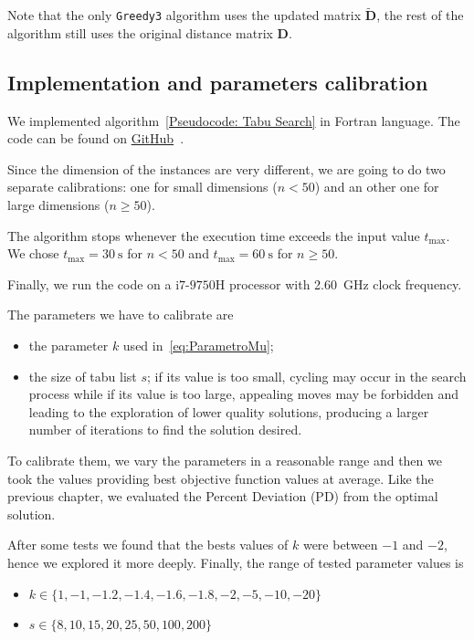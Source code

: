 Note that the only \texttt{Greedy3} algorithm uses the updated matrix $\tilde{\bm D}$, the rest of the algorithm still uses the original distance matrix $\bm D$.



\subsection*{Implementation and parameters calibration}
We implemented algorithm~\ref{Pseudocode: Tabu Search} in Fortran language. The code can be found on \href{https://github.com/TDS-Firenze/QAP/blob/master/TABU_SEARCH.f90}{GitHub}~\cite{Mazzoli2020}.

Since the dimension of the instances are very different, we are going to do two separate calibrations: one for small dimensions ($n < 50$) and an other one for large dimensions ($n \ge 50$).

The algorithm stops whenever the execution time exceeds the input value $t_\mathrm{max}$. We chose $t_\mathrm{max}=\SI{30}{\second}$ for $n<50$ and $t_\mathrm{max}=\SI{60}{\second}$ for $n\ge 50$.

Finally, we run the code on a   i$7$-$9750$H processor with \SI{2.60}{\giga\Hz} clock frequency.

The parameters we have to calibrate are 
\begin{itemize}
	\item the parameter $k$ used in~\eqref{eq:ParametroMu}; 
	\item the size of tabu list $s$; if its value is too small, cycling may occur in the
	search process while if its value is too large, appealing moves may be forbidden and leading to	the exploration of lower quality solutions, producing a larger number of iterations to find the solution desired.
\end{itemize}


To calibrate them, we vary the parameters in a  reasonable range and then we took the values providing best objective function values at average. Like the previous chapter,  we evaluated the Percent Deviation (PD) from the optimal solution.

After some tests we found that the bests values of $k$ were between $-1$ and $-2$, hence we explored it more deeply. Finally, the range of tested parameter values  is 
\begin{itemize}
	\item $k \in \{1, -1,-1.2, -1.4, -1.6, -1.8, -2, -5, -10, -20 \}$
	\item $s \in \{8,10,15,20,25,50,100,200\} $
\end{itemize}




